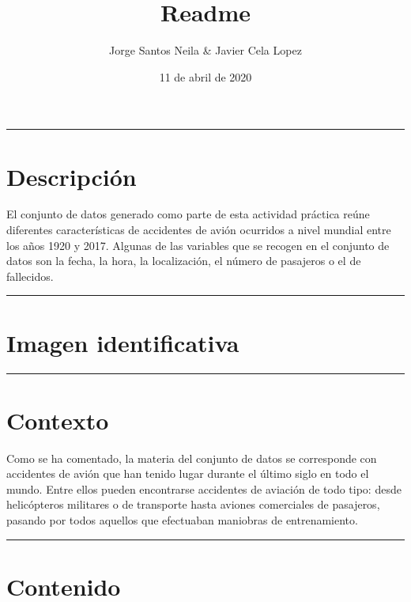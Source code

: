 \documentclass[]{article}
\title{Readme}
\author{Jorge Santos Neila \& Javier Cela Lopez}
\date{11 de abril de 2020}
\begin{document}
\maketitle

{
\setcounter{tocdepth}{2}
\tableofcontents
}
\begin{center}\rule{0.5\linewidth}{0.5pt}\end{center}

\hypertarget{descripciuxf3n}{%
\section{Descripción}\label{descripciuxf3n}}

El conjunto de datos generado como parte de esta actividad práctica
reúne diferentes características de accidentes de avión ocurridos a
nivel mundial entre los años 1920 y 2017. Algunas de las variables que
se recogen en el conjunto de datos son la fecha, la hora, la
localización, el número de pasajeros o el de fallecidos.

\begin{center}\rule{0.5\linewidth}{0.5pt}\end{center}

\hypertarget{imagen-identificativa}{%
\section{Imagen identificativa}\label{imagen-identificativa}}

\begin{center}\rule{0.5\linewidth}{0.5pt}\end{center}

\hypertarget{contexto}{%
\section{Contexto}\label{contexto}}

Como se ha comentado, la materia del conjunto de datos se corresponde
con accidentes de avión que han tenido lugar durante el último siglo en
todo el mundo. Entre ellos pueden encontrarse accidentes de aviación de
todo tipo: desde helicópteros militares o de transporte hasta aviones
comerciales de pasajeros, pasando por todos aquellos que efectuaban
maniobras de entrenamiento.

\begin{center}\rule{0.5\linewidth}{0.5pt}\end{center}

\hypertarget{contenido}{%
\section{Contenido}\label{contenido}}
\end{document}
